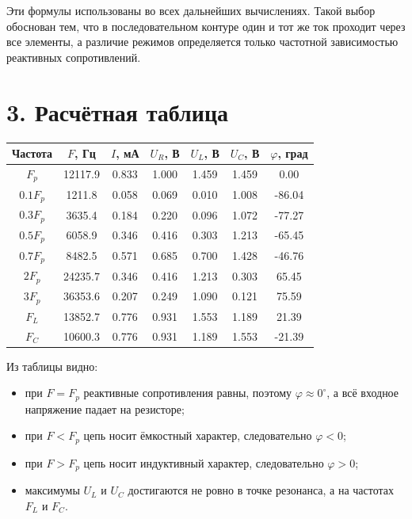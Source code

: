 \documentclass[12pt,a4paper]{article}
\begin{document}
Эти формулы использованы во всех дальнейших вычислениях. Такой выбор обоснован тем, что в последовательном контуре один и тот же ток проходит через все элементы, а различие режимов определяется только частотной зависимостью реактивных сопротивлений.

\section*{3. Расчётная таблица}
\begin{center}
\small
\begin{tabular}{|c|c|c|c|c|c|c|}
\hline
Частота & $F$, Гц & $I$, мА & $U_R$, В & $U_L$, В & $U_C$, В & $\varphi$, град \\
\hline
$F_p$ & 12117.9 & 0.833 & 1.000 & 1.459 & 1.459 & 0.00 \\ \hline
$0.1F_p$ & 1211.8 & 0.058 & 0.069 & 0.010 & 1.008 & -86.04 \\ \hline
$0.3F_p$ & 3635.4 & 0.184 & 0.220 & 0.096 & 1.072 & -77.27 \\ \hline
$0.5F_p$ & 6058.9 & 0.346 & 0.416 & 0.303 & 1.213 & -65.45 \\ \hline
$0.7F_p$ & 8482.5 & 0.571 & 0.685 & 0.700 & 1.428 & -46.76 \\ \hline
$2F_p$ & 24235.7 & 0.346 & 0.416 & 1.213 & 0.303 & 65.45 \\ \hline
$3F_p$ & 36353.6 & 0.207 & 0.249 & 1.090 & 0.121 & 75.59 \\ \hline
$F_L$ & 13852.7 & 0.776 & 0.931 & 1.553 & 1.189 & 21.39 \\ \hline
$F_C$ & 10600.3 & 0.776 & 0.931 & 1.189 & 1.553 & -21.39 \\ \hline
\end{tabular}
\end{center}

Из таблицы видно:
\begin{itemize}[leftmargin=1.2cm]
\item при $F=F_p$ реактивные сопротивления равны, поэтому $\varphi\approx 0^\circ$, а всё входное напряжение падает на резисторе;
\item при $F<F_p$ цепь носит ёмкостный характер, следовательно $\varphi<0$;
\item при $F>F_p$ цепь носит индуктивный характер, следовательно $\varphi>0$;
\item максимумы $U_L$ и $U_C$ достигаются не ровно в точке резонанса, а на частотах $F_L$ и $F_C$.
\end{itemize}
\end{document}
